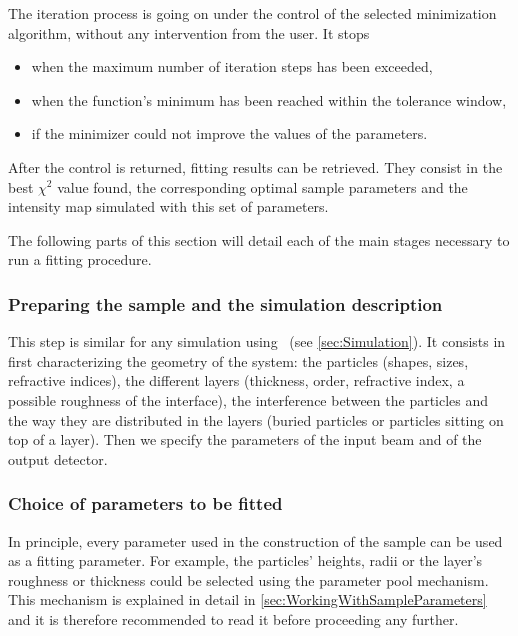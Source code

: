 The iteration process is going on under the control of the selected minimization
algorithm, without any intervention from the
user. It stops
\begin{itemize}
\item when the maximum number of iteration steps has been exceeded,
\item when the function's minimum has been reached within the tolerance window,
\item if the minimizer could not improve the values of the parameters.
\end{itemize}

After the control is returned, fitting results can be retrieved.
They consist in the best $\chi^2$ value found, the corresponding
optimal sample parameters and the intensity map simulated with this set of parameters.

The following parts of this section will detail each of
the main stages necessary to run a fitting procedure.


\subsubsection{Preparing the sample and the simulation description}

This step is similar for any simulation using \BornAgain\ (see \cref{sec:Simulation}). It consists in first characterizing  the geometry of the system: the particles
(shapes, sizes, refractive
indices), the different layers (thickness,
order, refractive index, a possible roughness of the interface), the
interference between the particles and the way they are distributed in
the layers (buried particles or particles sitting on top of a
layer).
Then we specify the parameters of the input beam and of the
output detector.


\subsubsection{Choice of parameters to be fitted}

In principle, every parameter used in the construction of the sample
can be used as a fitting parameter. For example, the particles'
heights, radii or the layer's roughness or thickness could be selected
using the
parameter pool mechanism.
This mechanism is explained in detail in
\cref{sec:WorkingWithSampleParameters} and it is therefore recommended
to read it before proceeding any further.


